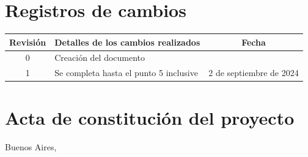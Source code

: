 \documentclass[
11pt, %
codirector, %
]{charter}
\begin{document}
\maketitle
\thispagestyle{empty}
\pagebreak

\thispagestyle{empty}
{\setlength{\parskip}{0pt}
	\tableofcontents{}
}
\pagebreak

\section*{Registros de cambios}
\label{sec:registro}

\begin{table}[ht]
	\label{tab:registro}
	\centering
	\begin{tabularx}{\linewidth}{@{}|c|X|c|@{}}
		\hline
		\rowcolor[HTML]{C0C0C0}
		Revisión & \multicolumn{1}{c|}{\cellcolor[HTML]{C0C0C0}Detalles de los cambios realizados} & Fecha                       \\ \hline
		0        & Creación del documento                                                          & \fechaInicioName            \\ \hline
		1        & Se completa hasta el punto 5 inclusive                                          & {2} de {septiembre} de 2024 \\ \hline

	\end{tabularx}
\end{table}

\pagebreak

\section*{Acta de constitución del proyecto}
\label{sec:acta}

\begin{flushright}
	Buenos Aires, \fechaInicioName
\end{flushright}
\end{document}
